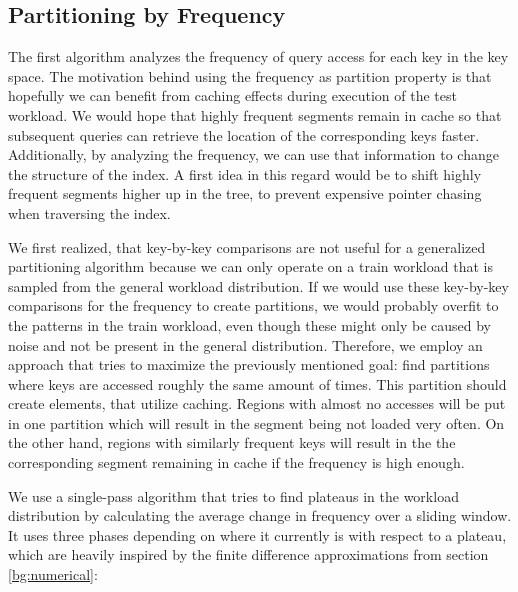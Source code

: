 \subsection{Partitioning by Frequency} \label{sec:frequency}
The first algorithm analyzes the frequency of query access for each key in the key space. The motivation behind using the frequency as partition property is that hopefully we can benefit from caching effects during execution of the test workload. We would hope that highly frequent segments remain in cache so that subsequent queries can retrieve the location of the corresponding keys faster. Additionally, by analyzing the frequency, we can use that information to change the structure of the index. A first idea in this regard would be to shift highly frequent segments higher up in the tree, to prevent expensive pointer chasing when traversing the index.

We first realized, that key-by-key comparisons are not useful for a generalized partitioning algorithm because we can only operate on a train workload that is sampled from the general workload distribution. If we would use these key-by-key comparisons for the frequency to create partitions, we would probably overfit to the patterns in the train workload, even though these might only be caused by noise and not be present in the general distribution. Therefore, we employ an approach that tries to maximize the previously mentioned goal: find partitions where keys are accessed roughly the same amount of times. This partition should create elements, that utilize caching. Regions with almost no accesses will be put in one partition which will result in the segment being not loaded very often. On the other hand, regions with similarly frequent keys will result in the the corresponding segment remaining in cache if the frequency is high enough.

We use a single-pass algorithm that tries to find plateaus in the workload distribution by calculating the average change in frequency over a sliding window. It uses three phases depending on where it currently is with respect to a plateau, which are heavily inspired by the finite difference approximations from section \ref{bg:numerical}:

